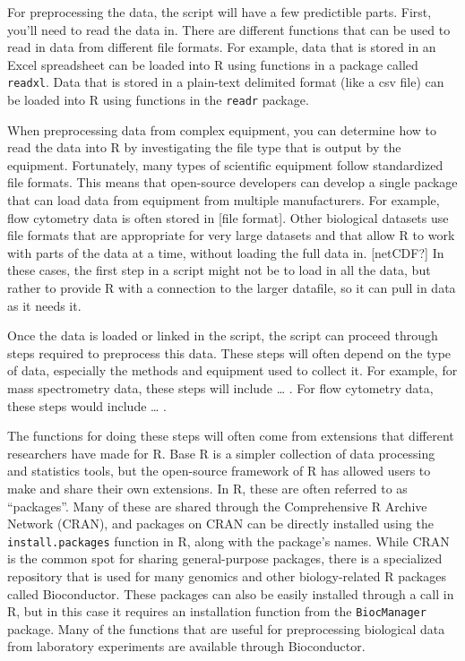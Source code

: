 \documentclass[]{tufte-book}
\begin{document}
For preprocessing the data, the script will have a few predictible parts. First,
you'll need to read the data in. There are different functions that can be used
to read in data from different file formats. For example, data that is stored in
an Excel spreadsheet can be loaded into R using functions in a package called
\texttt{readxl}. Data that is stored in a plain-text delimited format (like a csv file)
can be loaded into R using functions in the \texttt{readr} package.

When preprocessing data from complex equipment, you can determine how to read the
data into R by investigating the file type that is output by the equipment.
Fortunately, many types of scientific equipment follow standardized file formats.
This means that open-source developers can develop a single package that can
load data from equipment from multiple manufacturers. For example, flow cytometry
data is often stored in {[}file format{]}. Other biological datasets use file
formats that are appropriate for very large datasets and that allow R to work
with parts of the data at a time, without loading the full data in. {[}netCDF?{]}
In these cases, the first step in a script might not be to load in all the data,
but rather to provide R with a connection to the larger datafile, so it can
pull in data as it needs it.

Once the data is loaded or linked in the script, the script can proceed through
steps required to preprocess this data. These steps will often depend on the type
of data, especially the methods and equipment used to collect it. For example, for
mass spectrometry data, these steps will include \ldots{} . For flow cytometry data,
these steps would include \ldots{} .

The functions for doing these steps will often come from extensions that
different researchers have made for R. Base R is a simpler collection of data
processing and statistics tools, but the open-source framework of R has allowed
users to make and share their own extensions. In R, these are often referred to
as ``packages''. Many of these are shared through the Comprehensive R Archive
Network (CRAN), and packages on CRAN can be directly installed using the
\texttt{install.packages} function in R, along with the package's names. While CRAN
is the common spot for sharing general-purpose packages, there is a specialized
repository that is used for many genomics and other biology-related R packages
called Bioconductor. These packages can also be easily installed through a call
in R, but in this case it requires an installation function from the \texttt{BiocManager}
package. Many of the functions that are useful for preprocessing biological
data from laboratory experiments are available through Bioconductor.
\end{document}
